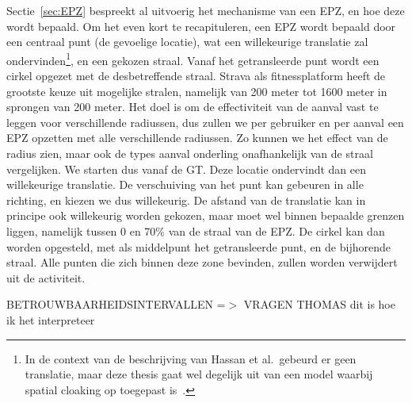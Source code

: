 Sectie~\ref{sec:EPZ} bespreekt al uitvoerig het mechanisme van een \ac{EPZ}, en
hoe deze wordt bepaald. Om het even kort te recapituleren, een \ac{EPZ} wordt
bepaald door een centraal punt (de gevoelige locatie), wat een willekeurige
translatie zal ondervinden\footnote{In de context van de beschrijving van
    Hassan et al.\ gebeurd er geen translatie, maar deze thesis gaat wel degelijk
    uit van een model waarbij spatial cloaking op toegepast
    is~\cite{sec18has3:online}.}, en een gekozen straal. Vanaf het getransleerde
punt wordt een cirkel opgezet met de desbetreffende straal. Strava als
fitnessplatform heeft de grootste keuze uit mogelijke stralen, namelijk van 200
meter tot 1600 meter in sprongen van 200 meter. Het doel is om de effectiviteit
van de aanval vast te leggen voor verschillende radiussen, dus zullen we per
gebruiker en per aanval een \ac{EPZ} opzetten met alle verschillende radiussen.
Zo kunnen we het effect van de radius zien, maar ook de types aanval onderling
onafhankelijk van de straal vergelijken. We starten dus vanaf de \ac{GT}. Deze
locatie ondervindt dan een willekeurige translatie. De verschuiving van het
punt kan gebeuren in alle richting, en kiezen we dus willekeurig. De afstand
van de translatie kan in principe ook willekeurig worden gekozen, maar moet wel
binnen bepaalde grenzen liggen, namelijk tussen 0 en 70\% van de straal van de
\ac{EPZ}. De cirkel kan dan worden opgesteld, met als middelpunt het
getransleerde punt, en de bijhorende straal. Alle punten die zich binnen deze
zone bevinden, zullen worden verwijdert uit de activiteit.

BETROUWBAARHEIDSINTERVALLEN =$>$ VRAGEN THOMAS \newline dit is hoe ik het
interpreteer

